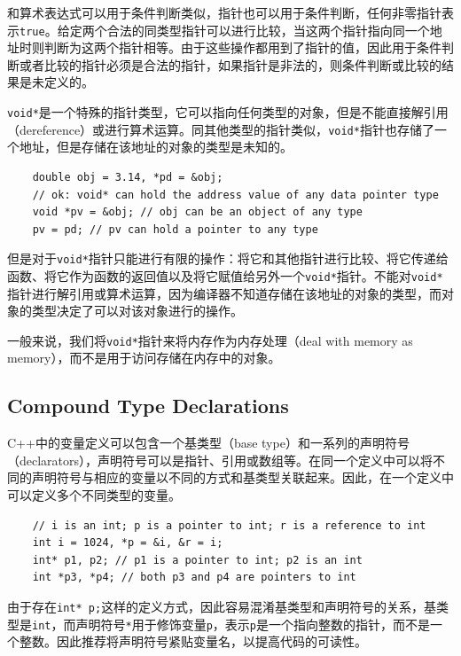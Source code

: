 和算术表达式可以用于条件判断类似，指针也可以用于条件判断，任何非零指针表示\texttt{true}。给定两个合法的同类型指针可以进行比较，当这两个指针指向同一个地址时则判断为这两个指针相等。由于这些操作都用到了指针的值，因此用于条件判断或者比较的指针必须是合法的指针，如果指针是非法的，则条件判断或比较的结果是未定义的。

\texttt{void*}是一个特殊的指针类型，它可以指向任何类型的对象，但是不能直接解引用（dereference）或进行算术运算。同其他类型的指针类似，\texttt{void*}指针也存储了一个地址，但是存储在该地址的对象的类型是未知的。

\begin{verbatim}
    double obj = 3.14, *pd = &obj;
    // ok: void* can hold the address value of any data pointer type
    void *pv = &obj; // obj can be an object of any type
    pv = pd; // pv can hold a pointer to any type
\end{verbatim}

但是对于\texttt{void*}指针只能进行有限的操作：将它和其他指针进行比较、将它传递给函数、将它作为函数的返回值以及将它赋值给另外一个\texttt{void*}指针。不能对\texttt{void*}指针进行解引用或算术运算，因为编译器不知道存储在该地址的对象的类型，而对象的类型决定了可以对该对象进行的操作。

一般来说，我们将\texttt{void*}指针来将内存作为内存处理（deal with memory as memory），而不是用于访问存储在内存中的对象。

\subsection{Compound Type Declarations}
C++中的变量定义可以包含一个基类型（base type）和一系列的声明符号（declarators），声明符号可以是指针、引用或数组等。在同一个定义中可以将不同的声明符号与相应的变量以不同的方式和基类型关联起来。因此，在一个定义中可以定义多个不同类型的变量。

\begin{verbatim}
    // i is an int; p is a pointer to int; r is a reference to int
    int i = 1024, *p = &i, &r = i;
    int* p1, p2; // p1 is a pointer to int; p2 is an int
    int *p3, *p4; // both p3 and p4 are pointers to int
\end{verbatim}

由于存在\texttt{int* p;}这样的定义方式，因此容易混淆基类型和声明符号的关系，基类型是\texttt{int}，而声明符号\texttt{*}用于修饰变量\texttt{p}，表示\texttt{p}是一个指向整数的指针，而不是一个整数。因此推荐将声明符号紧贴变量名，以提高代码的可读性。

